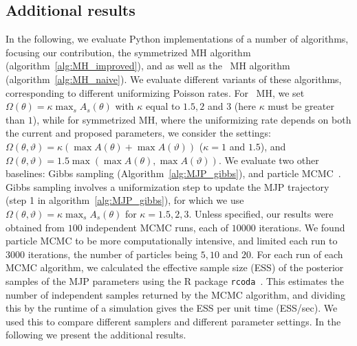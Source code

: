 \subsection{Additional results}
In the following, we evaluate Python implementations of a number of algorithms, focusing our contribution, the symmetrized MH algorithm (algorithm~\ref{alg:MH_improved}), and as well as the \naive\ MH algorithm (algorithm~\ref{alg:MH_naive}).
We evaluate different variants of these algorithms, corresponding to different uniformizing Poisson rates. %
For \naive\ MH, we set $\Omega(\theta) = \kappa \max_s A_s(\theta) $ with $\kappa$  equal to $1.5, 2$ and $3$ (here $\kappa$ must be greater than $1$), 
while for symmetrized MH, where the uniformizing rate depends on both the current and proposed parameters, we consider the settings:
 $\Omega(\theta, \vartheta) = \kappa (\max A(\theta) + \max A(\vartheta))$ 
 ($\kappa = 1$ and $1.5$), and 
$\Omega(\theta, \vartheta) = 1.5 \max(\max A(\theta), \max A(\vartheta))$.
We evaluate two other baselines: Gibbs sampling (Algorithm~\ref{alg:MJP_gibbs}), %
and particle MCMC~\citep[][see also section~\ref{sec:pmcmc} in the appendix]{Andrieu10}. 
Gibbs sampling involves a uniformization step to update the MJP trajectory (step 1 in algorithm~\ref{alg:MJP_gibbs}), for which we use $\Omega(\theta,\vartheta) = \kappa \max_s A_s(\theta)$ for $\kappa=1.5,2,3$. 
Unless specified, our results were obtained from $100$ independent MCMC runs, each of $10000$ iterations.
We found particle MCMC to be more computationally intensive, and limited each run to $3000$ iterations, the number of particles being $5, 10$ and $20$.
For each run of each MCMC algorithm, we calculated the effective sample size (ESS) of the posterior samples of the MJP parameters using the R package \texttt{rcoda}~\citep{Rcoda2006}. 
This estimates the number of independent samples returned by the MCMC algorithm, and dividing this by the runtime of a simulation gives the ESS per unit time (ESS/sec). 
We used this to compare different samplers and different parameter settings. In the following we present the additional results.

